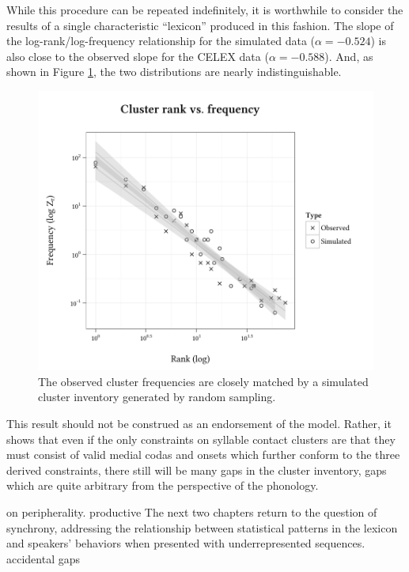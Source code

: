 While this procedure can be repeated indefinitely, it is worthwhile to consider the results of a single characteristic ``lexicon'' produced in this fashion. The slope of the log-rank/log-frequency relationship for the simulated data ($\alpha = -0.524$) is also close to the observed slope for the CELEX data ($\alpha = -0.588$). And, as shown in Figure \ref{sim}, the two distributions are nearly indistinguishable. 

\begin{figure}
\centering
\includegraphics{sim.pdf}
\caption{The observed cluster frequencies are closely matched by a simulated cluster inventory generated by random sampling.}
\label{sim}
\end{figure}

This result should not be construed as an endorsement of the \citet{Pierrehumbert1994} model. Rather, it shows that even if the only constraints on syllable contact clusters are that they must consist of valid medial codas and onsets which further conform to the three derived constraints, there still will be many gaps in the cluster inventory, gaps which are quite arbitrary from the perspective of the phonology.

\citet{Borowsky1989} on peripherality.
productive \citet{Duanmu2008}
The next two chapters return to the question of synchrony, addressing the relationship between statistical patterns in the lexicon and speakers' behaviors when presented with underrepresented sequences.
accidental gaps
\citet[][419f.]{Hayes2008a}



